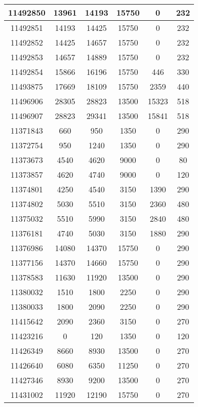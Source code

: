 \begin{appendices}
\begin{center}
\begin{longtable}{|c|c|c|c|c|c|}
11492850 & 13961 & 14193 & 15750 & 0     & 232 \\ \hline
11492851 & 14193 & 14425 & 15750 & 0     & 232 \\ \hline
11492852 & 14425 & 14657 & 15750 & 0     & 232 \\ \hline
11492853 & 14657 & 14889 & 15750 & 0     & 232 \\ \hline
11492854 & 15866 & 16196 & 15750 & 446   & 330 \\ \hline
11493875 & 17669 & 18109 & 15750 & 2359  & 440 \\ \hline
11496906 & 28305 & 28823 & 13500 & 15323 & 518 \\ \hline
11496907 & 28823 & 29341 & 13500 & 15841 & 518 \\ \hline
11371843 & 660   & 950   & 1350  & 0     & 290 \\ \hline
11372754 & 950   & 1240  & 1350  & 0     & 290 \\ \hline
11373673 & 4540  & 4620  & 9000  & 0     & 80  \\ \hline
11373857 & 4620  & 4740  & 9000  & 0     & 120 \\ \hline
11374801 & 4250  & 4540  & 3150  & 1390  & 290 \\ \hline
11374802 & 5030  & 5510  & 3150  & 2360  & 480 \\ \hline
11375032 & 5510  & 5990  & 3150  & 2840  & 480 \\ \hline
11376181 & 4740  & 5030  & 3150  & 1880  & 290 \\ \hline
11376986 & 14080 & 14370 & 15750 & 0     & 290 \\ \hline
11377156 & 14370 & 14660 & 15750 & 0     & 290 \\ \hline
11378583 & 11630 & 11920 & 13500 & 0     & 290 \\ \hline
11380032 & 1510  & 1800  & 2250  & 0     & 290 \\ \hline
11380033 & 1800  & 2090  & 2250  & 0     & 290 \\ \hline
11415642 & 2090  & 2360  & 3150  & 0     & 270 \\ \hline
11423216 & 0     & 120   & 1350  & 0     & 120 \\ \hline
11426349 & 8660  & 8930  & 13500 & 0     & 270 \\ \hline
11426640 & 6080  & 6350  & 11250 & 0     & 270 \\ \hline
11427346 & 8930  & 9200  & 13500 & 0     & 270 \\ \hline
11431002 & 11920 & 12190 & 15750 & 0     & 270 \\ \hline

\end{longtable}
\end{center}
\end{appendices}
